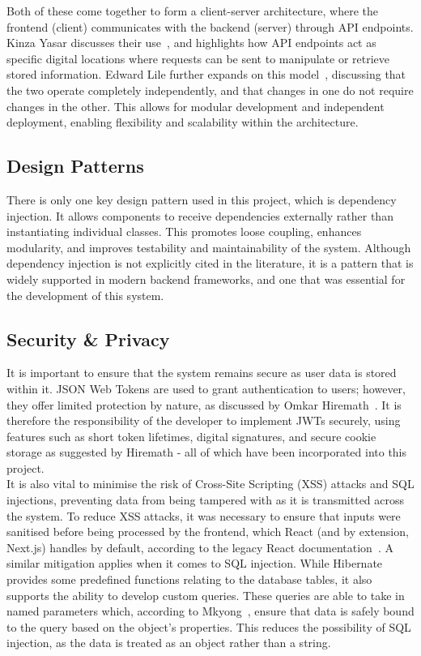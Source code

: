 \documentclass[]{final_report}
\begin{document}
Both of these come together to form a client-server architecture, where the frontend (client) communicates with the backend (server) through API endpoints. Kinza Yasar discusses their use~\cite{API}, and highlights how API endpoints act as specific digital locations where requests can be sent to manipulate or retrieve stored information. Edward Lile further expands on this model~\cite{CSA}, discussing that the two operate completely independently, and that changes in one do not require changes in the other. This allows for modular development and independent deployment, enabling flexibility and scalability within the architecture.

\subsection{Design Patterns}

There is only one key design pattern used  in this project, which is dependency injection. It allows components to receive dependencies externally rather than instantiating individual classes. This promotes loose coupling, enhances modularity, and improves testability and maintainability of the system. Although dependency injection is not explicitly cited in the literature, it is a pattern that is widely supported in modern backend frameworks, and one that was essential for the development of this system.

\subsection{Security \& Privacy}

It is important to ensure that the system remains secure as user data is stored within it. JSON Web Tokens are used to grant authentication to users; however, they offer limited protection by nature, as discussed by Omkar Hiremath~\cite{JWT}. It is therefore the responsibility of the developer to implement JWTs securely, using features such as short token lifetimes, digital signatures, and secure cookie storage as suggested by Hiremath - all of which have been incorporated into this project.\\

It is also vital to minimise the risk of Cross-Site Scripting (XSS) attacks  and SQL injections, preventing data from being tampered with as it is transmitted across the system. To reduce XSS attacks, it was necessary to ensure that inputs were sanitised before being processed by the frontend, which React (and by extension, Next.js) handles by default, according to the legacy React documentation~\cite{XSS_REACT}. A similar mitigation applies when it comes to SQL injection. While Hibernate provides some predefined functions relating to the database tables, it also supports the ability to develop custom queries. These queries are able to take in named parameters which, according to Mkyong~\cite{SQL_PARAM}, ensure that data is safely bound to the query based on the object's properties. This reduces the possibility of SQL injection, as the data is treated as an object rather than a string.\\
\end{document}
